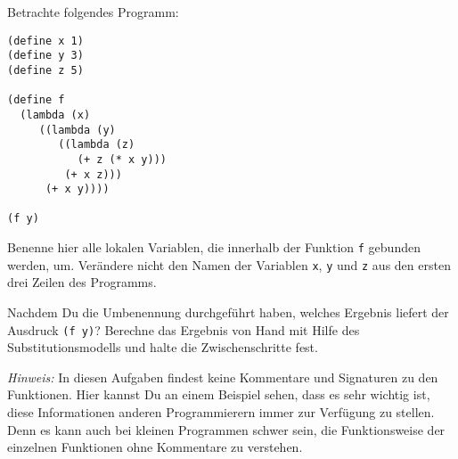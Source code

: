 \begin{aufgabe}
  Betrachte folgendes Programm:

\begin{lstlisting}
(define x 1)
(define y 3)
(define z 5)

(define f
  (lambda (x)   
     ((lambda (y)
        ((lambda (z)
           (+ z (* x y)))
         (+ x z)))
      (+ x y))))

(f y)
\end{lstlisting}

  Benenne hier alle lokalen Variablen, die innerhalb der Funktion
  \verb"f" gebunden werden, um. Verändere nicht den Namen der
  Variablen \verb"x", \verb"y" und \verb"z" aus den ersten drei Zeilen
  des Programms.

  Nachdem Du die Umbenennung durchgeführt haben, welches Ergebnis liefert
  der Ausdruck \verb"(f y)"? Berechne das Ergebnis von Hand mit Hilfe
  des Substitutionsmodells und halte die Zwischenschritte fest.

  \noindent \emph{Hinweis:} In diesen Aufgaben findest keine
  Kommentare und Signaturen zu den Funktionen. Hier kannst Du an einem
  Beispiel sehen, dass es sehr wichtig ist, diese Informationen
  anderen Programmierern immer zur Verfügung zu stellen. Denn es kann
  auch bei kleinen Programmen schwer sein, die Funktionsweise der
  einzelnen Funktionen ohne Kommentare zu verstehen.
\end{aufgabe}

